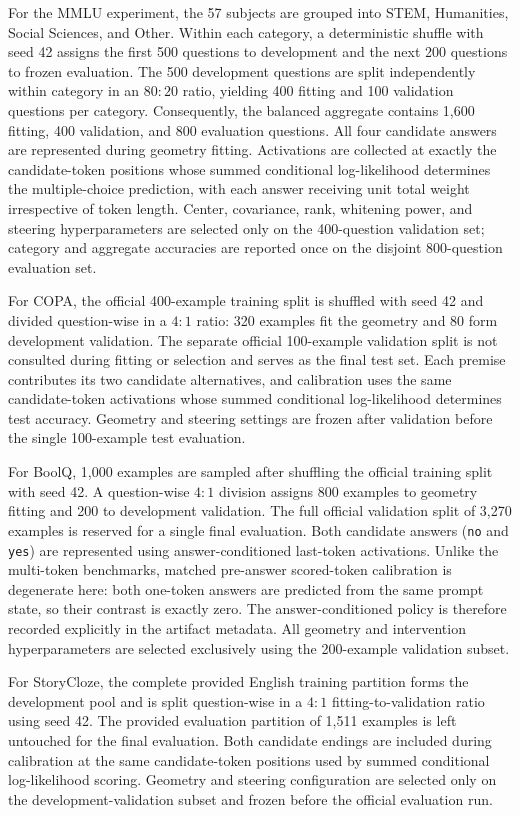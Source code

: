 \documentclass[11pt]{article}
\begin{document}
For the MMLU experiment, the 57 subjects are grouped into STEM, Humanities,
Social Sciences, and Other.  Within each category, a deterministic shuffle
with seed 42 assigns the first 500 questions to development and the next 200
questions to frozen evaluation.  The 500 development questions are split
independently within category in an $80:20$ ratio, yielding 400 fitting and
100 validation questions per category.  Consequently, the balanced aggregate
contains 1,600 fitting, 400 validation, and 800 evaluation questions.  All
four candidate answers are represented during geometry fitting.  Activations
are collected at exactly the candidate-token positions whose summed
conditional log-likelihood determines the multiple-choice prediction, with
each answer receiving unit total weight irrespective of token length.  Center,
covariance, rank, whitening power, and steering hyperparameters are selected
only on the 400-question validation set; category and aggregate accuracies are
reported once on the disjoint 800-question evaluation set.

For COPA, the official 400-example training split is shuffled with seed 42 and
divided question-wise in a $4:1$ ratio: 320 examples fit the geometry and 80
form development validation.  The separate official 100-example validation
split is not consulted during fitting or selection and serves as the final test
set.  Each premise contributes its two candidate alternatives, and calibration
uses the same candidate-token activations whose summed conditional
log-likelihood determines test accuracy.  Geometry and steering settings are
frozen after validation before the single 100-example test evaluation.

For BoolQ, 1,000 examples are sampled after shuffling the official training
split with seed 42.  A question-wise $4:1$ division assigns 800 examples to
geometry fitting and 200 to development validation.  The full official
validation split of 3,270 examples is reserved for a single final evaluation.
Both candidate answers (\texttt{no} and \texttt{yes}) are represented using
answer-conditioned last-token activations. Unlike the multi-token benchmarks,
matched pre-answer scored-token calibration is degenerate here: both one-token
answers are predicted from the same prompt state, so their contrast is exactly
zero. The answer-conditioned policy is therefore recorded explicitly in the
artifact metadata. All geometry and intervention hyperparameters are selected
exclusively using the 200-example validation subset.

For StoryCloze, the complete provided English training partition forms the
development pool and is split question-wise in a $4:1$ fitting-to-validation
ratio using seed 42. The provided evaluation partition of 1,511 examples is
left untouched for the final evaluation. Both candidate endings are included
during calibration at the same candidate-token positions used by summed
conditional log-likelihood scoring. Geometry and steering configuration are
selected only on the development-validation subset and frozen before the
official evaluation run.
\end{document}
